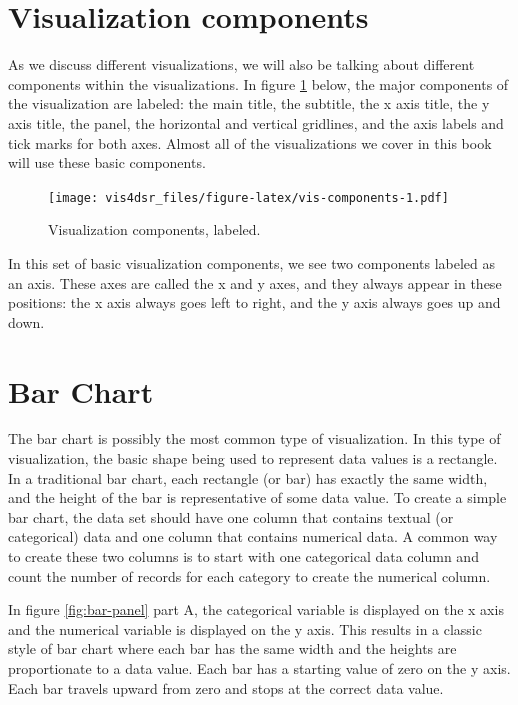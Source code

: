 \documentclass[
]{krantz}
\begin{document}
\hypertarget{visualization-components}{%
\section{Visualization components}\label{visualization-components}}

As we discuss different visualizations, we will also be talking about different
components within the visualizations. In figure \ref{fig:vis-components} below,
the major components of the visualization are labeled: the main title, the subtitle,
the x axis title, the y axis title, the panel, the horizontal and vertical gridlines,
and the axis labels and tick marks for both axes. Almost all of the visualizations we cover
in this book will use these basic components.

\begin{figure}
\centering
\texttt{[image: vis4dsr\_files/figure-latex/vis-components-1.pdf]}
\caption{\label{fig:vis-components}Visualization components, labeled.}
\end{figure}

In this set of basic visualization components, we see two components labeled as an axis.
These axes are called the x and y axes, and they always appear in these positions:
the x axis always goes left to right, and the y axis always goes up and down.

\hypertarget{bar-chart}{%
\section{Bar Chart}\label{bar-chart}}

The bar chart is possibly the most common type of visualization. In this type
of visualization, the basic shape being used to represent data values is a rectangle.
In a traditional bar chart, each rectangle (or bar) has exactly the same width,
and the height of the bar is representative of some data value. To create a simple
bar chart, the data set should have one column that contains textual (or categorical)
data and one column that contains numerical data. A common way to create these two columns
is to start with one categorical data column and count the number of records for each
category to create the numerical column.

In figure \ref{fig:bar-panel} part A, the categorical variable is displayed on the
x axis and the numerical variable is displayed on the y axis. This results in a
classic style of bar chart where each bar has the same width and the heights are
proportionate to a data value. Each bar has a starting value of zero on the y axis.
Each bar travels upward from zero and stops at the correct data value.
\end{document}
